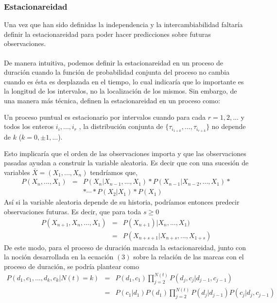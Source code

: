 \subsubsection{Estacionareidad}
Una vez que han sido definidas la independencia y la intercambiabilidad faltar\'ia definir la estacionareidad para poder hacer predicciones sobre futuras observaciones.\\
\\
De manera intuitiva, podemos definir la estacionareidad en un proceso de duraci\'on cuando la funci\'on de probabilidad conjunta del proceso no cambia cuando es \'esta es desplazada en el tiempo, lo cual indicar\'ia que lo importante es la longitud de los intervalos, no la localizaci\'on de los mismos. Sin embargo, de una manera m\'as t\'ecnica, \cite{daley2003} definen la estacionareidad en un proceso como:
\begin{defi}
Un proceso puntual es estacionario por intervalos cuando para cada $r=1,2,...$ y todos los enteros $i_i,...,i_r$ , la distribuci\'on conjunta de $\{\tau_{i_{1+k}},...,\tau_{i_{r+k}}\}$ no depende de $k$ ($k=0, \pm 1, ...$).
\end{defi}
Esto implicar\'ia que el orden de las observaciones importa y que las observaciones pasadas ayudan a construir la variable aleatoria. Es decir que con una sucesi\'on de variables $\bar{X}=(X_1,...,X_n)$ tendr\'iamos que,
\begin{eqnarray}
P(X_n,...,X_1)&=&P(X_n|X_{n-1},...,X_1)*P(X_{n-1}|X_{n-2},...,X_1)* \nonumber\\
               && * \cdots *P(X_2|X_1)*P(X_1)\nonumber
\end{eqnarray}	
As\'i si la variable aleatoria depende de su historia, podr\'iamos entonces predecir observaciones futuras. Es decir, que para toda $s \geq 0$
\begin{eqnarray*}
P(X_{n+1},X_n,...,X_1)&=&P(X_{n+1})|X_n,...,X_1)\\
                      &=&P(X_{n+s+1}|X_{n+s},...,X_{1+s}) \nonumber
\end{eqnarray*}
De este modo, para el proceso de duraci\'on marcada la estacionareidad, junto con la noci\'on desarrollada en la ecuaci\'on $(3)$ sobre la relaci\'on de las marcas con el proceso de duraci\'on, se podr\'ia plantear como
\begin{eqnarray*}
P(d_1,c_1,...,d_k,c_k|N(t)=k)&=&P(d_1,c_1)\prod_{j=2}^{N(t)} P(d_j,c_j|d_{j-1},c_{j-1})\\
                             &=&P(c_1|d_1)P(d_1) \prod_{j=2}^{N(t)} P(d_j|d_{j-1})P(c_j|d_j,c_{j-1}) 
\end{eqnarray*}

